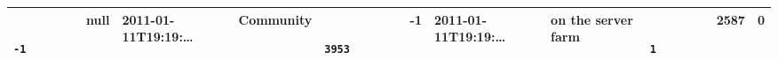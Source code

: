 \documentclass[12pt,a4paper,twoside,openright,titlepage,final]{article}
\begin{document}
\begin{enumerate}
\begin{longtable}[]{@{}lllllllllll@{}}
\begin{minipage}[t]{0.06\columnwidth}
\begin{verbatim}
			-1
			\end{verbatim}
			\strut\end{minipage} &
		\begin{minipage}[t]{0.03\columnwidth}\raggedright\strut
			null
			\strut\end{minipage} &
		\begin{minipage}[t]{0.12\columnwidth}\raggedright\strut
			2011-01-11T19:19:\ldots{}
			\strut\end{minipage} &
		\begin{minipage}[t]{0.07\columnwidth}\raggedright\strut
			Community
			\strut\end{minipage} &
		\begin{minipage}[t]{0.06\columnwidth}\raggedright\strut
			\begin{verbatim}
			3953
			\end{verbatim}
			\strut\end{minipage} &
		\begin{minipage}[t]{0.02\columnwidth}\raggedright\strut
			-1
			\strut\end{minipage} &
		\begin{minipage}[t]{0.12\columnwidth}\raggedright\strut
			2011-01-11T19:19:\ldots{}
			\strut\end{minipage} &
		\begin{minipage}[t]{0.11\columnwidth}\raggedright\strut
			on the server farm
			\strut\end{minipage} &
		\begin{minipage}[t]{0.06\columnwidth}\raggedright\strut
			\begin{verbatim}
			1
			\end{verbatim}
			\strut\end{minipage} &
		\begin{minipage}[t]{0.04\columnwidth}\raggedright\strut
			2587
			\strut\end{minipage} &
		\begin{minipage}[t]{0.04\columnwidth}\raggedright\strut
			0
			\strut\end{minipage}\tabularnewline
		\bottomrule
	\end{longtable}
	

\end{enumerate}
\end{document}
